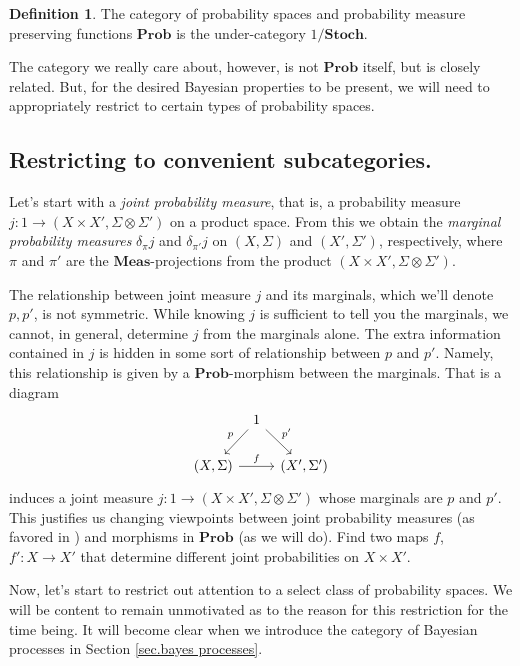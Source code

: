 \documentclass[11pt]{amsart}
\newcommand{\cat}[1]{\mathbf{#1}}
\newcommand{\from}{\colon}
\theoremstyle{remark}
\theoremstyle{definition}
\newtheorem{defn}[thm]{Definition}
\begin{document}
\begin{defn}
	The category of probability spaces and probability measure preserving functions $\cat{Prob}$ is the under-category $1/\cat{Stoch}$.
\end{defn}

The category we really care about, however, is not $\cat{Prob}$ itself, but is closely related. But, for the desired Bayesian properties to be present, we will need to appropriately restrict to certain types of probability spaces.  

\subsection{Restricting to convenient subcategories.}

Let's start with a \textit{joint probability measure}, that is, a probability measure $j \from 1 \to (X \times X', \Sigma \otimes \Sigma')$ on a product space.  From this we obtain the \textit{marginal probability measures} $\delta_\pi j$ and $\delta_{\pi'}j$ on $(X,\Sigma)$ and $(X',\Sigma')$, respectively, where $\pi$ and $\pi'$ are the $\cat{Meas}$-projections from the product $(X \times X', \Sigma \otimes \Sigma')$. 

The relationship between joint measure $j$ and its marginals, which we'll denote $p,p'$, is not symmetric.  While knowing $j$ is sufficient to tell you the marginals, we cannot, in general, determine $j$ from the marginals alone. The extra information contained in $j$ is hidden in some sort of relationship between $p$ and $p'$. Namely, this relationship is given by a $\cat{Prob}$-morphism between the marginals. That is a diagram
\[
\begin{tikzcd}[column sep=tiny]
{} & {1} \ar[dl,swap,"p"] \ar[dr,"p'"] & {} \\
{(X,\Sigma)} \ar[rr,"f" ]& {} & {(X',\Sigma')}
\end{tikzcd}
\]
induces a joint measure $j \from 1 \to (X \times X',\Sigma \otimes \Sigma')$ whose marginals are $p$ and $p'$. This justifies us changing viewpoints between joint probability measures (as favored in \cite{AbramBlutePanan_NuclearTraceIdeals}) and morphisms in $\cat{Prob}$ (as we will do). {\color{red}Find two maps $f$, $f' :X \to X'$ that determine different joint probabilities on $X \times X'$.}

Now, let's start to restrict out attention to a select class of probability spaces.  We will be content to remain unmotivated as to the reason for this restriction for the time being.  It will become clear when we introduce the category of Bayesian processes in Section \ref{sec.bayes processes}.
\end{document}
